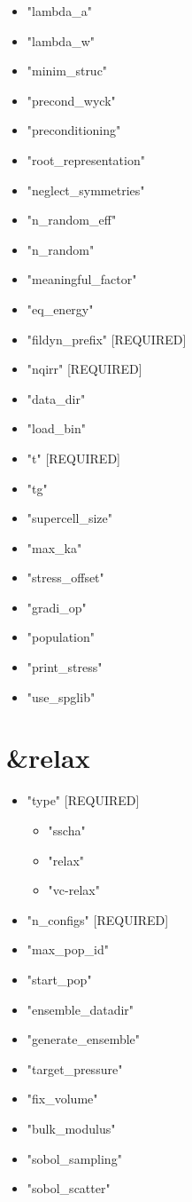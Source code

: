 \documentclass[]{scrartcl}
\begin{document}
\begin{itemize}
	\item "lambda\_a"
	\item "lambda\_w"
	\item "minim\_struc"
	\item "precond\_wyck"
	\item "preconditioning"
	\item "root\_representation"
	\item "neglect\_symmetries"
	\item "n\_random\_eff"
	\item "n\_random"
	\item "meaningful\_factor"
	\item "eq\_energy"
	\item "fildyn\_prefix" [REQUIRED]
	\item "nqirr" [REQUIRED]
	\item "data\_dir"
	\item "load\_bin"
	\item "t" [REQUIRED]
	\item "tg"
	\item "supercell\_size"
	\item "max\_ka"
	\item "stress\_offset"
	\item "gradi\_op"
	\item "population"
	\item "print\_stress"
	\item "use\_spglib"
\end{itemize}
\section{\&relax}
\begin{itemize}
	\item "type" [REQUIRED]
	\begin{itemize}
		\item "sscha"
		\item "relax"	
		\item "vc-relax"
	\end{itemize}
	\item "n\_configs" [REQUIRED]
	\item "max\_pop\_id"
	\item "start\_pop"
	\item "ensemble\_datadir"
	\item "generate\_ensemble"
	\item "target\_pressure"
	\item "fix\_volume"
	\item "bulk\_modulus"
	\item "sobol\_sampling"
	\item "sobol\_scatter"
\end{itemize}
\end{document}
